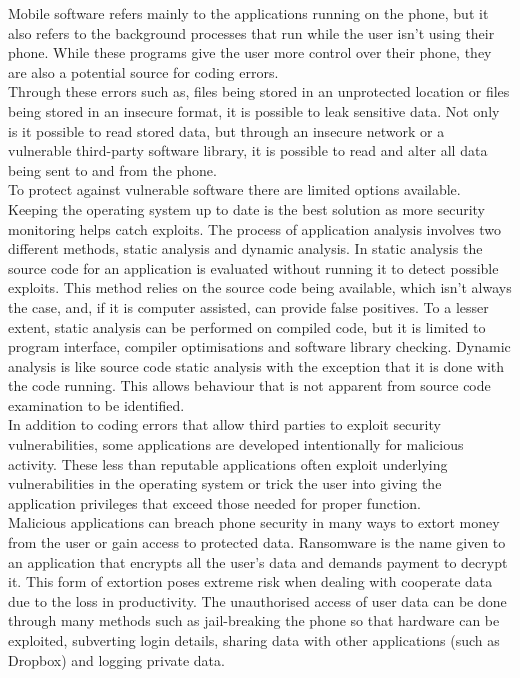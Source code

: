 Mobile software refers mainly to the applications running on the phone, but it  also refers to the background processes that run while the user isn't using their phone. While these programs give the user more control over their phone, they are also a potential source for coding errors.\\ 
Through these errors such as, files being stored in an unprotected location or files being stored in an insecure format, it is possible to leak sensitive data.\cite{Reference14} Not only is it possible to read stored data, but through an insecure network or a vulnerable third-party software library, it is possible to read and alter all data being sent to and from the phone.\\ 
To protect against vulnerable software there are limited options available. Keeping the operating system up to date is the best solution as more security monitoring helps catch exploits.\cite{Reference12} The process of application analysis involves two different methods, static analysis and dynamic analysis. In static analysis the source code for an application is evaluated without running it to detect possible exploits. This method relies on the source code being available, which isn’t always the case, and, if it is computer assisted, can provide false positives.\cite{Reference15} To a lesser extent, static analysis can be performed on compiled code, but it is limited to program interface, compiler optimisations and software library checking. Dynamic analysis is like source code static analysis with the exception that it is done with the code running. This allows behaviour that is not apparent from source code examination to be identified.\cite{Reference13}\\
In addition to coding errors that allow third parties to exploit security vulnerabilities, some applications are developed intentionally for malicious activity. These less than reputable applications often exploit underlying vulnerabilities in the operating system or trick the user into giving the application privileges that exceed those needed for proper function.\cite{Reference16}\\
Malicious applications can breach phone security in many ways to extort money from the user or gain access to protected data. Ransomware is the name given to an application that encrypts all the user’s data and demands payment to decrypt it. This form of extortion poses extreme risk when dealing with cooperate data due to the loss in productivity. The unauthorised access of user data can be done through many methods such as jail-breaking the phone so that hardware can be exploited, subverting login details, sharing data with other applications (such as Dropbox) and logging private data.\cite{Reference13}\\
